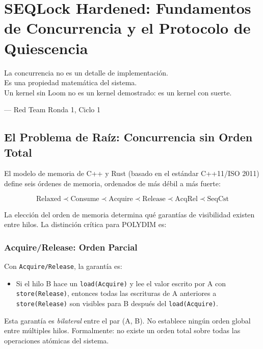 \chapter{SEQLock Hardened: Fundamentos de Concurrencia y el Protocolo de Quiescencia}
\label{ch:seqlock}

\epigraph{La concurrencia no es un detalle de implementación.\\
Es una propiedad matemática del sistema.\\ 
Un kernel sin Loom no es un kernel demostrado:
es un kernel con suerte.}{--- Red Team Ronda 1, Ciclo 1}

\section{El Problema de Raíz: Concurrencia sin Orden Total}

El modelo de memoria de C++ y Rust (basado en el estándar C++11/ISO 2011)
define seis órdenes de memoria, ordenados de más débil a más fuerte:

\begin{equation}
\text{Relaxed} \prec \text{Consume} \prec \text{Acquire} \prec \text{Release} \prec \text{AcqRel} \prec \text{SeqCst}
\end{equation}

La elección del orden de memoria determina qué garantías de visibilidad existen
entre hilos. La distinción crítica para POLYDIM es:

\subsection{Acquire/Release: Orden Parcial}

Con \texttt{Acquire/Release}, la garantía es:
\begin{itemize}
\item Si el hilo B hace un \texttt{load(Acquire)} y lee el valor escrito por A con
\texttt{store(Release)}, entonces todas las escrituras de A anteriores a \texttt{store(Release)}
son visibles para B después del \texttt{load(Acquire)}.
\end{itemize}

Esta garantía es \textit{bilateral} entre el par (A, B). No establece ningún orden
global entre múltiples hilos. Formalmente: no existe un orden total sobre todas las
operaciones atómicas del sistema.

